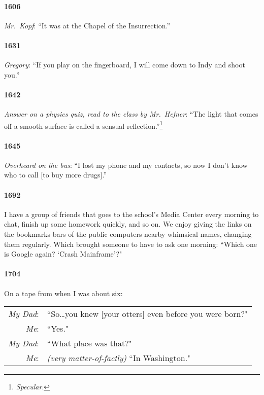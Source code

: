 \documentclass[10pt]{memoir}
\newcommand{\speakertag}[1]{\emph{#1}: }
\newcommand{\st}{\speakertag}
\newcommand{\intro}[1]{\emph{#1}}
\begin{document}
\paragraph{1606} \intro{Mr.\ Kopf}: ``It was at the Chapel of the Insurrection.''

\paragraph{1631} \intro{Gregory}: ``If you play on the fingerboard, I will come down to Indy and shoot you.''

\paragraph{1642} \intro{Answer on a physics quiz, read to the class by Mr.\ Hefner}: ``The light that comes off a smooth surface is called a sensual reflection.''\thinspace\footnote{\emph{Specular}.}

\paragraph{1645} \intro{Overheard on the bus}: ``I lost my phone and my contacts, so now I don't know who to call [to buy more drugs].''

\paragraph{1692} I have a group of friends that goes to the school's Media Center every morning to chat, finish up some homework quickly, and so on. We enjoy giving the links on the bookmarks bars of the public computers nearby whimsical names, changing them regularly. Which brought someone to have to ask one morning: ``Which one is Google again? `Crash Mainframe'?"

\paragraph{1704} On a tape from when I was about six:\\

\noindent \begin{tabularx}{\textwidth}{r X}
  \st{My Dad} & ``So\ldots you knew [your otters] even before you were born?"\\
  \st{Me} & ``Yes."\\
  \st{My Dad} & ``What place was that?"\\
  \st{Me} & \emph{(very matter-of-factly)} ``In Washington."
\end{tabularx}
\end{document}
